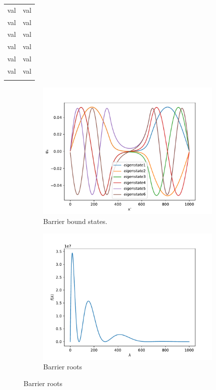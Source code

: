 \documentclass{article}
\begin{document}
\begin{tabular}{c c}
    val & val \\
    val & val \\
    val & val \\
    val & val \\
    val & val \\
    val & val \\
    \label{tab:eigenvals}
\end{tabular}

\begin{figure}[H]
    \begin{subfigure}[b]{0.5\textwidth}
        \centering
        \includegraphics[width=\linewidth]{./media/bound_eigenstates_barrier.pdf}
        \caption{Barrier bound states.}
        \label{fig:barrier-bound-states}
    \end{subfigure}
    \begin{subfigure}[b]{0.5\textwidth}
        \includegraphics[width=\linewidth]{./media/f_of_lambda_roots.pdf}
        \caption{Barrier roots}
        \label{fig:barrier-roots}
    \end{subfigure}
\end{figure}
\end{document}
